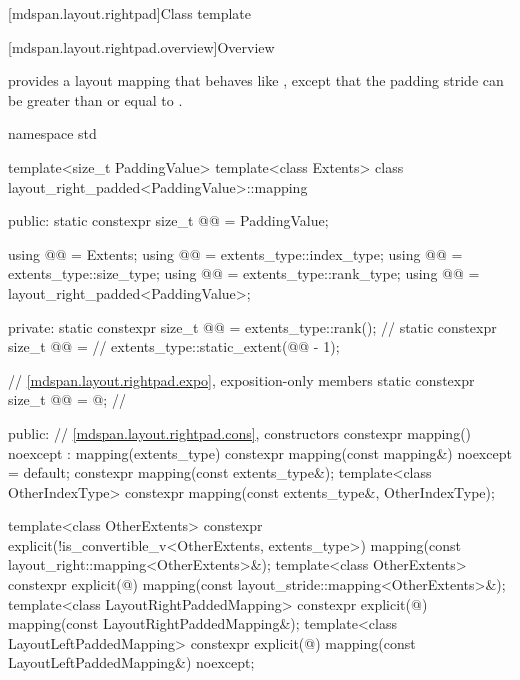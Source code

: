 [mdspan.layout.rightpad]{Class template }

[mdspan.layout.rightpad.overview]{Overview}

\pnum
{} provides a layout mapping
that behaves like ,
except that the padding stride 
can be greater than or equal to
.

%
\begin{codeblock}
namespace std {
  template<size_t PaddingValue>
  template<class Extents>
  class layout_right_padded<PaddingValue>::mapping {
  public:
    static constexpr size_t @@ = PaddingValue;

    using @@ = Extents;
    using @@ = extents_type::index_type;
    using @@ = extents_type::size_type;
    using @@ = extents_type::rank_type;
    using @@ = layout_right_padded<PaddingValue>;

  private:
    static constexpr size_t @@ = extents_type::rank();    // \expos
    static constexpr size_t @@ =             // \expos
      extents_type::static_extent(@@ - 1);

    // \ref{mdspan.layout.rightpad.expo}, exposition-only members
    static constexpr size_t @@ = @\seebelow@; // \expos

  public:
    // \ref{mdspan.layout.rightpad.cons}, constructors
    constexpr mapping() noexcept : mapping(extents_type{}) {}
    constexpr mapping(const mapping&) noexcept = default;
    constexpr mapping(const extents_type&);
    template<class OtherIndexType>
      constexpr mapping(const extents_type&, OtherIndexType);

    template<class OtherExtents>
      constexpr explicit(!is_convertible_v<OtherExtents, extents_type>)
        mapping(const layout_right::mapping<OtherExtents>&);
    template<class OtherExtents>
      constexpr explicit(@\seebelow@)
        mapping(const layout_stride::mapping<OtherExtents>&);
    template<class LayoutRightPaddedMapping>
      constexpr explicit(@\seebelow@)
        mapping(const LayoutRightPaddedMapping&);
    template<class LayoutLeftPaddedMapping>
      constexpr explicit(@\seebelow@)
        mapping(const LayoutLeftPaddedMapping&) noexcept;

}}
\end{codeblock}
